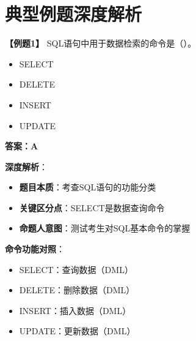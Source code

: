 \documentclass[12pt, a4paper]{article}
\newenvironment{bluebox}[1]{%
  \begin{trivlist}
  \item[\hskip\labelsep \textbf{#1}]
  \setlength{\parskip}{0.5ex}
  \setlength{\itemsep}{0.5ex}
}{%
  \end{trivlist}
}
\begin{document}
\section{典型例题深度解析}

\begin{bluebox}{例题1：SQL功能分类}
	\textbf{【例题1】} SQL语句中用于数据检索的命令是（\quad）。

	\begin{itemize}
		\item[A)] SELECT
		\item[B)] DELETE
		\item[C)] INSERT
		\item[D)] UPDATE
	\end{itemize}

	\textbf{答案：A}

	\textbf{深度解析}：

	\begin{itemize}
		\item \textbf{题目本质}：考查SQL语句的功能分类
		\item \textbf{关键区分点}：SELECT是数据查询命令
		\item \textbf{命题人意图}：测试考生对SQL基本命令的掌握
	\end{itemize}

	\textbf{命令功能对照}：

	\begin{itemize}
		\item SELECT：查询数据（DML）
		\item DELETE：删除数据（DML）
		\item INSERT：插入数据（DML）
		\item UPDATE：更新数据（DML）
	\end{itemize}
\end{bluebox}
\end{document}

